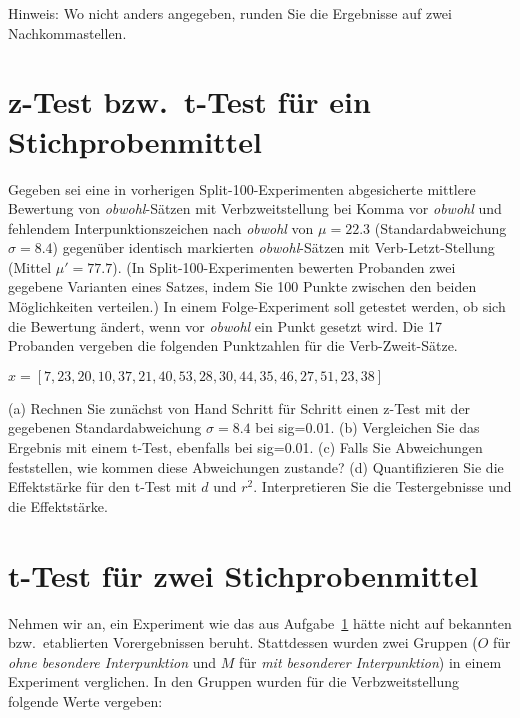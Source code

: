\begin{center}
  Hinweis: Wo nicht anders angegeben, runden Sie die Ergebnisse auf zwei Nachkommastellen.
\end{center}

\section{z-Test bzw.\ t-Test für ein Stichprobenmittel}\label{sec:zt}

Gegeben sei eine in vorherigen Split-100-Experimenten abgesicherte mittlere Bewertung von \textit{obwohl}-Sätzen mit Verbzweitstellung bei Komma vor \textit{obwohl} und fehlendem Interpunktionszeichen nach \textit{obwohl} von $\mu=22.3$ (Standardabweichung $\sigma=8.4$) gegenüber identisch markierten \textit{obwohl}-Sätzen mit Verb-Letzt-Stellung (Mittel $\mu\prime=77.7$).
(In Split-100-Experimenten bewerten Probanden zwei gegebene Varianten eines Satzes, indem Sie 100 Punkte zwischen den beiden Möglichkeiten verteilen.)
In einem Folge-Experiment soll getestet werden, ob sich die Bewertung ändert, wenn vor \textit{obwohl} ein Punkt gesetzt wird.
Die 17 Probanden vergeben die folgenden Punktzahlen für die Verb-Zweit-Sätze.

\begin{center}
  \begin{math}
    x = [7, 23, 20, 10, 37, 21, 40, 53, 28, 30, 44, 35, 46, 27, 51, 23, 38]
  \end{math}
\end{center}

(a) Rechnen Sie zunächst von Hand Schritt für Schritt einen z-Test mit der gegebenen Standardabweichung $\sigma=8.4$ bei sig=0.01.
(b) Vergleichen Sie das Ergebnis mit einem t-Test, ebenfalls bei sig=0.01.
(c) Falls Sie Abweichungen feststellen, wie kommen diese Abweichungen zustande?
(d) Quantifizieren Sie die Effektstärke für den t-Test mit $d$ und $r^2$.
Interpretieren Sie die Testergebnisse und die Effektstärke.

\section{t-Test für zwei Stichprobenmittel} \label{sec:t}

Nehmen wir an, ein Experiment wie das aus Aufgabe~\ref{sec:zt} hätte nicht auf bekannten bzw.\ etablierten Vorergebnissen beruht.
Stattdessen wurden zwei Gruppen ($O$ für \textit{ohne besondere Interpunktion} und $M$ für \textit{mit besonderer Interpunktion}) in einem Experiment verglichen.
In den Gruppen wurden für die Verbzweitstellung folgende Werte vergeben:

